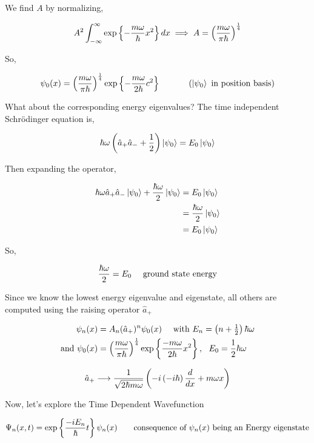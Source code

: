 \documentclass[english, 11pt]{article}
\begin{document}
       We find $A$ by normalizing,

       \begin{align*}
         A^2 \int_{-\infty}^{\infty} \exp \left\{ -\frac{m\omega}{\hbar}x^2 \right\} dx \implies A = \left( \frac{m\omega}{\pi \hbar} \right)^{\frac{1}{4}}
       \end{align*}

       So,

       \[ \psi_0(x) = \left( \f{m\omega}{\pi\hbar} \right)^{\f{1}{4}}\expo{-\f{m\omega}{2\hbar}c^2} \ \ \ \ \ \ \ \ \ \ (\ket{\psi_0} \mbox{ in position basis})\]

       What about the corresponding energy eigenvalues? The time independent Schrödinger equation is,

       \[ \hbar \omega \left(\hat{a}_+\hat{a}_- + \frac{1}{2}\right) \left|\psi_0\right\rangle = E_0 \left|\psi_0\right\rangle \]

       Then expanding the operator,

       \begin{align*}
         \hbar \omega \hat{a}_+\hat{a}_-\left|\psi_0\right\rangle + \frac{\hbar \omega}{2} \left|\psi_0\right\rangle & = E_0\left|\psi_0\right\rangle \\
        & = \frac{\hbar \omega}{2} \left|\psi_0\right\rangle \\
        & = E_0\left|\psi_0\right\rangle
       \end{align*}

       So,

       \[ \f{\hbar\omega}{2} = E_0 \ \ \ \ \mbox{ground state energy} \]

       Since we know the lowest energy eigenvalue and eigenstate, all others are computed using the raising operator $\hat{a}_+$

       \begin{align*}
         \psi_n(x) & = A_n (\hat{a}_+)^n\psi_0(x) \ \ \ \ \mbox{with $E_n = \left( n + \frac{1}{2} \right) \hbar \omega$} \\
         \mbox{and } \psi_0(x) & = \left( \frac{m\omega}{\pi\hbar} \right)^{\frac{1}{4}}\exp \left\{ \frac{-m\omega}{2\hbar}x^2 \right\}, \ \ E_0 = \frac{1}{2}\hbar\omega
       \end{align*}

       \[ \hat{a}_+ \longrightarrow \frac{1}{\sqrt{2\hbar m \omega}} \left( -i \left( -i\hbar \right) \frac{d}{dx} + m\omega x \right) \]

       Now, let's explore the Time Dependent Wavefunction

       \[ \Psi_n(x,t) = \exp \left\{ \frac{-iE_n}{\hbar}t \right\}\psi_n(x) \ \ \ \ \ \ \mbox{consequence of $\psi_n(x)$ being an Energy eigenstate} \]
\end{document}
